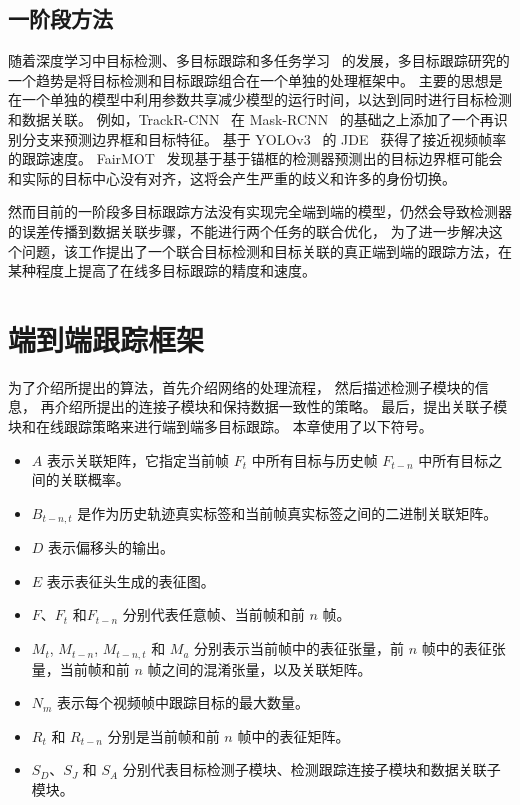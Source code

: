\subsection{一阶段方法}
随着深度学习中目标检测、多目标跟踪和多任务学习~\cite{ranjan2017hyperface,kokkinos2017ubernet} 的发展，多目标跟踪研究的一个趋势是将目标检测和目标跟踪组合在一个单独的处理框架中。
主要的思想是在一个单独的模型中利用参数共享减少模型的运行时间，以达到同时进行目标检测和数据关联。
例如，TrackR-CNN~\cite{voigtlaender2019mots} 在 Mask-RCNN~\cite{he2017mask} 的基础之上添加了一个再识别分支来预测边界框和目标特征。
基于 YOLOv3~\cite{redmon2018yolov3} 的 JDE~\cite{jde} 获得了接近视频帧率的跟踪速度。
FairMOT~\cite{fairmot} 发现基于基于锚框的检测器预测出的目标边界框可能会和实际的目标中心没有对齐，这将会产生严重的歧义和许多的身份切换。

然而目前的一阶段多目标跟踪方法没有实现完全端到端的模型，仍然会导致检测器的误差传播到数据关联步骤，不能进行两个任务的联合优化，
为了进一步解决这个问题，该工作提出了一个联合目标检测和目标关联的真正端到端的跟踪方法，在某种程度上提高了在线多目标跟踪的精度和速度。


\section{端到端跟踪框架}
为了介绍所提出的算法，首先介绍网络的处理流程，
然后描述检测子模块的信息，
再介绍所提出的连接子模块和保持数据一致性的策略。
最后，提出关联子模块和在线跟踪策略来进行端到端多目标跟踪。
本章使用了以下符号。

\begin{itemize}
	\item $ A $ 表示关联矩阵，它指定当前帧 $F_t$ 中所有目标与历史帧 $F_{t-n}$ 中所有目标之间的关联概率。
	\item $B_{t-n, t}$ 是作为历史轨迹真实标签和当前帧真实标签之间的二进制关联矩阵。
	\item $D$ 表示偏移头的输出。
	\item $E$ 表示表征头生成的表征图。
	\item $F$、$F_t$ 和$F_{t-n}$ 分别代表任意帧、当前帧和前 $n$ 帧。
	\item $M_t$, $M_{t-n}$, $M_{t-n,t}$ 和 $M_a$ 分别表示当前帧中的表征张量，前 $n$ 帧中的表征张量，当前帧和前 $n$ 帧之间的混淆张量，以及关联矩阵。
	\item $N_m$ 表示每个视频帧中跟踪目标的最大数量。
	\item $R_t$ 和 $R_{t-n}$ 分别是当前帧和前 $n$ 帧中的表征矩阵。
	\item $S_D$、$S_J$ 和 $S_A$ 分别代表目标检测子模块、检测跟踪连接子模块和数据关联子模块。
\end{itemize}


